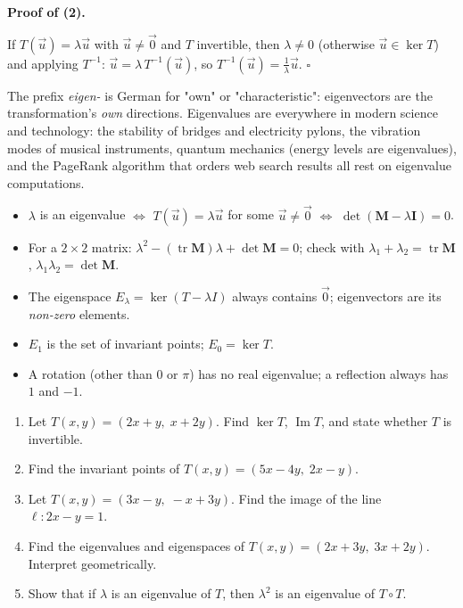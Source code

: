 \documentclass[11pt]{article}
\begin{document}
\textbf{Proof of (2).}\par
If $T(\vec{u}) = \lambda\vec{u}$ with $\vec{u}\neq\vec{0}$ and $T$ invertible, then $\lambda\neq 0$ (otherwise $\vec{u}\in\ker T$) and applying $T^{-1}$: $\vec{u} = \lambda\,T^{-1}(\vec{u})$, so $T^{-1}(\vec{u}) = \frac{1}{\lambda}\vec{u}$. \hfill$\square$

\begin{savaistu}
The prefix \emph{eigen-} is German for "own" or "characteristic": eigenvectors are the transformation's \emph{own} directions. Eigenvalues are everywhere in modern science and technology: the stability of bridges and electricity pylons, the vibration modes of musical instruments, quantum mechanics (energy levels are eigenvalues), and the PageRank algorithm that orders web search results all rest on eigenvalue computations.
\end{savaistu}

\begin{aretenir}
\begin{itemize}
    \item $\lambda$ is an eigenvalue $\iff$ $T(\vec{u}) = \lambda\vec{u}$ for some $\vec{u}\neq\vec{0}$ $\iff$ $\det(\mathbf{M}-\lambda\mathbf{I}) = 0$.
    \item For a $2\times2$ matrix: $\lambda^2 - (\operatorname{tr}\mathbf{M})\lambda + \det\mathbf{M} = 0$; check with $\lambda_1+\lambda_2 = \operatorname{tr}\mathbf{M}$, $\lambda_1\lambda_2 = \det\mathbf{M}$.
    \item The eigenspace $E_\lambda = \ker(T-\lambda I)$ always contains $\vec{0}$; eigenvectors are its \emph{non-zero} elements.
    \item $E_1$ is the set of invariant points; $E_0 = \ker T$.
    \item A rotation (other than $0$ or $\pi$) has no real eigenvalue; a reflection always has $1$ and $-1$.
\end{itemize}
\end{aretenir}

\begin{exercice}
\begin{enumerate}
    \item Let $T(x,y) = (2x + y,\; x + 2y)$. Find $\ker T$, $\operatorname{Im} T$, and state whether $T$ is invertible.
    \item Find the invariant points of $T(x,y) = (5x - 4y,\; 2x - y)$.
    \item Let $T(x,y) = (3x - y,\; -x + 3y)$. Find the image of the line $\ell : 2x - y = 1$.
    \item Find the eigenvalues and eigenspaces of $T(x,y) = (2x + 3y,\; 3x + 2y)$. Interpret geometrically.
    \item Show that if $\lambda$ is an eigenvalue of $T$, then $\lambda^2$ is an eigenvalue of $T\circ T$.
\end{enumerate}
\end{exercice}
\end{document}
